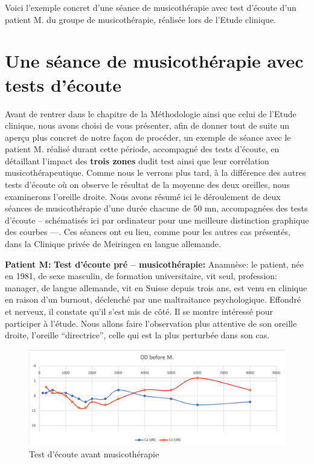 Voici l'exemple concret d'une  séance de
musicothérapie  avec test d'écoute  d'un 
patient M. du groupe de musicothérapie, réalisée lors de l'Etude clinique.

 \clearpage



\section{ Une séance de musicothérapie avec tests d'écoute}

Avant de rentrer dans le chapitre de la Méthodologie ainsi que celui de l'Etude clinique, nous avons 
choisi de vous présenter,  afin de donner tout de suite un aperçu plus concret  de notre façon de 
procéder, un exemple de 
séance avec le 
patient M. réalisé durant cette 
période, accompagné des tests d'écoute, en détaillant 
l'impact
des\textbf{ trois zones} dudit test ainsi que  leur corrélation musicothérapeutique. Comme nous le 
verrons plus tard, à la différence des 
autres tests d'écoute où on observe le résultat de la moyenne des deux oreilles, nous examinerons 
l'oreille droite.
Nous avons résumé ici le déroulement de deux séances de
musicothérapie d'une durée chacune  de 50 mn,  accompagnées des tests d'écoute --  
schématisés ici  par ordinateur pour une meilleure 
distinction graphique des courbes ---. Ces séances ont eu lieu, comme pour les autres cas 
présentés, dans la Clinique privée de Meiringen en langue allemande.

\textbf{Patient M:}
\textbf{ Test d'écoute pré -- musicothérapie:}
Anamnèse: le patient, née en 1981, de sexe masculin, de formation universitaire, vit seul, profession: 
manager, de langue allemande, vit en Suisse depuis trois ans,  est venu en clinique en raison d'un 
burnout, déclenché par 
une maltraitance psychologique. Effondré et nerveux, il  constate qu'il s'est mis de côté. Il se montre
intéressé pour participer à l'étude. Nous allons faire
l'observation plus attentive de
son oreille droite, l'oreille ``directrice'',
celle qui est la plus perturbée dans son cas. 


\begin{figure}[tbh]
	\centering
	\includegraphics[width=1\linewidth]{images/clinique/od_before_m.png}
	\caption{Test d'écoute avant musicothérapie}
	\label{fig:odbeforemeyer}
\end{figure}

